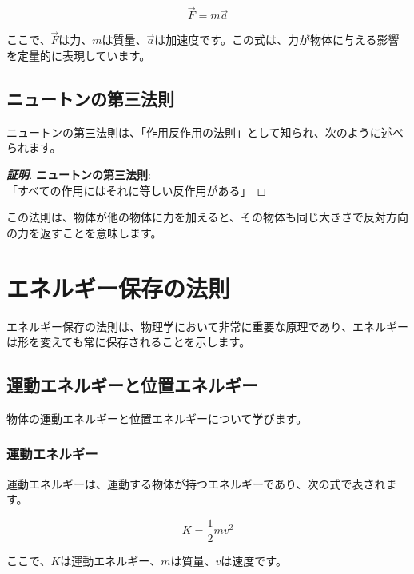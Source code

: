 \documentclass[
  11pt,
  pandoc,
  a4paper,
  pdflatex,
  japaram={jis2004}]{bxjsarticle}
\begin{document}
\[
\vec{F} = m\vec{a}
\]

ここで、\(\vec{F}\)は力、\(m\)は質量、\(\vec{a}\)は加速度です。この式は、力が物体に与える影響を定量的に表現しています。

\subsection{ニュートンの第三法則}\label{ux30cbux30e5ux30fcux30c8ux30f3ux306eux7b2cux4e09ux6cd5ux5247}

ニュートンの第三法則は、「作用反作用の法則」として知られ、次のように述べられます。

\begin{proof}[\textbf{証明}]

\textbf{ニュートンの第三法則}:\\
「すべての作用にはそれに等しい反作用がある」

\end{proof}

この法則は、物体が他の物体に力を加えると、その物体も同じ大きさで反対方向の力を返すことを意味します。

\section{エネルギー保存の法則}\label{ux30a8ux30cdux30ebux30aeux30fcux4fddux5b58ux306eux6cd5ux5247}

エネルギー保存の法則は、物理学において非常に重要な原理であり、エネルギーは形を変えても常に保存されることを示します。

\subsection{運動エネルギーと位置エネルギー}\label{ux904bux52d5ux30a8ux30cdux30ebux30aeux30fcux3068ux4f4dux7f6eux30a8ux30cdux30ebux30aeux30fc}

物体の運動エネルギーと位置エネルギーについて学びます。

\subsubsection{運動エネルギー}\label{ux904bux52d5ux30a8ux30cdux30ebux30aeux30fc}

運動エネルギーは、運動する物体が持つエネルギーであり、次の式で表されます。

\[
K = \frac{1}{2}mv^2
\]

ここで、\(K\)は運動エネルギー、\(m\)は質量、\(v\)は速度です。
\end{document}
